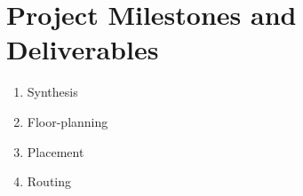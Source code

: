 
\chapter{Project Milestones and Deliverables}
\label{Chapter6}

\begin{enumerate}
    \item Synthesis
    \item Floor-planning
    \item Placement
    \item Routing
\end{enumerate}